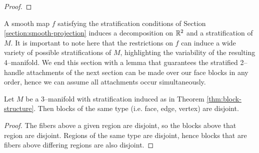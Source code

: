\begin{proof}
\end{proof}

A smooth map $f$ satisfying the stratification conditions of Section \ref{section:smooth-projection} induces a decomposition on $\mathbb{R}^2$ and a stratification of $M$.
It is important to note here that the restrictions on $f$ can induce a wide variety of possible stratifications of $M$, highlighting the variability of the resulting 4--manifold.
We end this section with a lemma that guarantees the stratified 2--handle attachments of the next section can be made over our face blocks in any order, hence we can assume all attachments occur simultaneously.


\begin{lem}
	Let $M$ be a 3--manifold with stratification induced as in Theorem \ref{thm:block-structure}.
	Then blocks of the same type (i.e. face, edge, vertex) are disjoint.
\end{lem}

\begin{proof}
	The fibers above a given region are disjoint, so the blocks above that region are disjoint.
	Regions of the same type are disjoint, hence blocks that are fibers above differing regions are also disjoint.
\end{proof}


